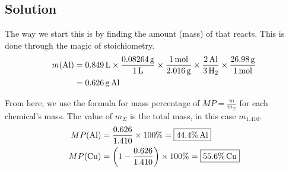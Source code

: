 \documentclass[10pt]{article}
\begin{document}
        \subsection{Solution}
            The way we start this is by finding the amount (mass) of  that reacts.
            This is done through the magic of stoichiometry.
            \begin{align}
                m(\ce{Al})  &=  0.849\,\unit{\liter}    \times  \frac{0.08264\,\unit{\gram}}{1\,\unit{\liter}}
                                                        \times  \frac{1\,\unit{\mole}}{2.016\,\unit{\gram}}
                                                        \times  \frac{2\,\ce{Al}}{3\,\ce{H2}}
                                                        \times  \frac{26.98\,\unit{\gram}}{1\,\unit{\mole}}\\
                    &=  0.626\,\unit{\gram}\,\ce{Al}
            \end{align}

            From here, we use the formula for mass percentage of $MP = \frac{m}{m_{\Sigma}}$ for each chemical's mass.
            The value of $m_{\Sigma}$ is the total mass, in this case $m_{1.410}$.
            \begin{align}
                MP(\ce{Al}) &=  \frac{0.626}{1.410} \times 100\%
                    =   \boxed{44.4\%\,\ce{Al}}\\
                MP(\ce{Cu}) &=  \left( 1 - \frac{0.626}{1.410} \right) \times 100\%
                    =   \boxed{55.6\%\,\ce{Cu}}
            \end{align}

\end{document}
